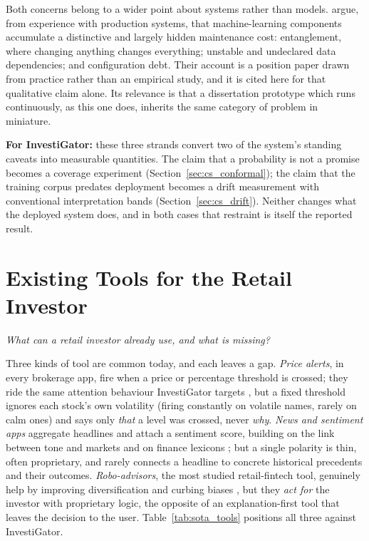 Both concerns belong to a wider point about systems rather than models. \textcite{sculley2015debt}
argue, from experience with production systems, that machine-learning components accumulate a
distinctive and largely hidden maintenance cost: entanglement, where changing anything changes
everything; unstable and undeclared data dependencies; and configuration debt. Their account is a
position paper drawn from practice rather than an empirical study, and it is cited here for that
qualitative claim alone. Its relevance is that a dissertation prototype which runs continuously,
as this one does, inherits the same category of problem in miniature.

\textbf{For InvestiGator:} these three strands convert two of the system's standing caveats into
measurable quantities. The claim that a probability is not a promise becomes a coverage experiment
(Section~\ref{sec:cs_conformal}); the claim that the training corpus predates deployment becomes a
drift measurement with conventional interpretation bands (Section~\ref{sec:cs_drift}). Neither
changes what the deployed system does, and in both cases that restraint is itself the reported
result.

\section{Existing Tools for the Retail Investor}
\label{sec:sota_tools}

\emph{What can a retail investor already use, and what is missing?}

Three kinds of tool are common today, and each leaves a gap. \emph{Price alerts}, in every brokerage app,
fire when a price or percentage threshold is crossed; they ride the same attention behaviour InvestiGator
targets \autocite{barber2008glitters}, but a fixed threshold ignores each stock's own volatility (firing
constantly on volatile names, rarely on calm ones) and says only \emph{that} a level was crossed, never
\emph{why}. \emph{News and sentiment apps} aggregate headlines and attach a sentiment score, building on the
link between tone and markets \autocite{tetlock2007media} and on finance lexicons
\autocite{loughran2011liability}; but a single polarity is thin, often proprietary, and rarely connects a
headline to concrete historical precedents and their outcomes. \emph{Robo-advisors}, the most studied
retail-fintech tool, genuinely help by improving diversification and curbing biases
\autocite{dacunto2019robo, cardillo2024robo}, but they \emph{act for} the investor with proprietary logic,
the opposite of an explanation-first tool that leaves the decision to the user. Table~\ref{tab:sota_tools}
positions all three against InvestiGator.

